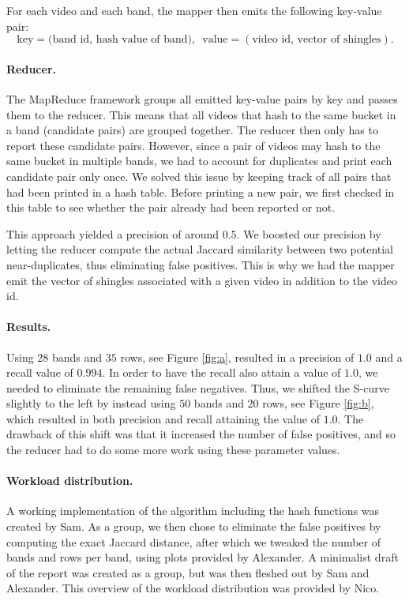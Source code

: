 \documentclass[a4paper,11pt]{article}
\begin{document}
For each video and each band, the mapper then emits the following key-value pair: $$\text{key}=\text{(band id, hash value of band)},\enspace\text{value}=(\text{video id, vector of shingles}).$$

\paragraph{Reducer.\!\!\!}
The MapReduce framework groups all emitted key-value pairs by key and passes them to the reducer. 
This means that all videos that hash to the same bucket in a band (candidate pairs) are grouped together. 
The reducer then only has to report these candidate pairs.
However, since a pair of videos may hash to the same bucket in multiple bands, we had to account for duplicates and print each candidate pair only once. 
We solved this issue by keeping track of all pairs that had been printed in a hash table. 
Before printing a new pair, we first checked in this table to see whether the pair already had been reported or not.

This approach yielded a precision of around $0.5$.
We boosted our precision by letting the reducer compute the actual Jaccard similarity between two potential near-duplicates, thus eliminating false positives. 
This is why we had the mapper emit the vector of shingles associated with a given video in addition to the video id. 

\paragraph{Results.\!\!\!}
Using $28$ bands and $35$ rows, see Figure \ref{fig:a}, resulted in a precision of $1.0$ and a recall value of $0.994$. In order to have the recall also attain a value of $1.0$, we needed to eliminate the remaining false negatives. Thus, we shifted the S-curve slightly to the left by instead using $50$ bands and $20$ rows, see Figure \ref{fig:b}, which resulted in both precision and recall attaining the value of $1.0$. The drawback of this shift was that it increased the number of false positives, and so the reducer had to do some more work using these parameter values.

\paragraph{Workload distribution.\!\!\!}
A working implementation of the algorithm including the hash functions was created by Sam. As a group, we then chose to eliminate the false positives by computing the exact Jaccard distance, after which we tweaked the number of bands and rows per band, using plots provided by Alexander. A minimalist draft of the report was created as a group, but was then fleshed out by Sam and Alexander. This overview of the workload distribution was provided by Nico.
\end{document}
